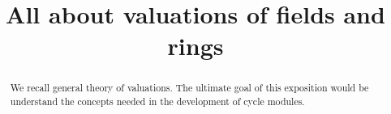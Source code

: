 
\title{All about valuations of fields and rings}

\begin{abstract}
We recall general theory of valuations. The ultimate goal of this 
exposition would be understand the concepts needed in the 
development of cycle modules.
\end{abstract}

